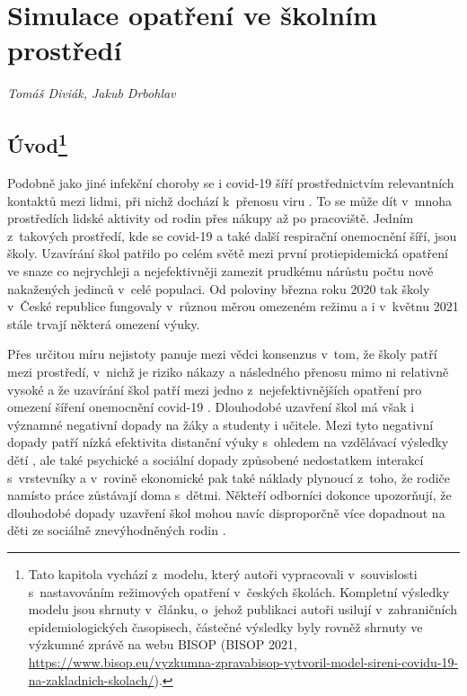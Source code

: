 
\chapter{Simulace opatření ve školním prostředí}\label{Skoly}

\textit{Tomáš Diviák, Jakub Drbohlav}
\vspace{15mm}

\section*{Úvod\footnote{Tato kapitola vychází z~modelu, který autoři vypracovali v~souvislosti s~nastavováním režimových opatření v~českých školách. Kompletní výsledky modelu jsou shrnuty v~článku, o~jehož publikaci autoři usilují v~zahraničních epidemiologických časopisech, částečné výsledky byly rovněž shrnuty ve výzkumné zprávě na webu BISOP (BISOP 2021, \url{https://www.bisop.eu/vyzkumna-zpravabisop-vytvoril-model-sireni-covidu-19-na-zakladnich-skolach/}).}}

Podobně jako jiné infekční choroby se i covid-19 šíří prostřednictvím relevantních kontaktů mezi lidmi, při nichž dochází k~přenosu viru \cite{pg:kucharski2020, vespignani2020modelling}. To se může dít v~mnoha prostředích lidské aktivity od rodin přes nákupy až po pracoviště. Jedním z~takových prostředí, kde se covid-19 a také další respirační onemocnění šíří, jsou školy. Uzavírání škol patřilo po celém světě mezi první protiepidemická opatření ve snaze co nejrychleji a nejefektivněji zamezit prudkému nárůstu počtu nově nakažených jedinců v~celé populaci. Od poloviny března roku 2020 tak školy v~České republice fungovaly v~různou měrou omezeném režimu a i v~květnu 2021 stále trvají některá omezení výuky.

Přes určitou míru nejistoty panuje mezi vědci konsenzus v~tom, že školy patří mezi prostředí, v~nichž je riziko nákazy a následného přenosu mimo ni relativně vysoké a že uzavírání škol patří mezi jedno z~nejefektivnějších opatření pro omezení šíření onemocnění covid-19 \cite{Brauner_etal2020, lessler2021household, Haug_etal2020}. Dlouhodobé uzavření škol má však i významné negativní dopady na žáky a studenty i učitele. Mezi tyto negativní dopady patří nízká efektivita distanční výuky s~ohledem na vzdělávací výsledky dětí \cite{engzell2021learning}, ale také psychické a sociální dopady způsobené nedostatkem interakcí s~vrstevníky \cite{bignardi2020longitudinal, ravens2021impact} a v~rovině ekonomické pak také náklady plynoucí z~toho, že rodiče namísto práce zůstávají doma s~dětmi. Někteří odborníci dokonce upozorňují, že dlouhodobé dopady uzavření škol mohou navíc disproporčně více dopadnout na děti ze sociálně znevýhodněných rodin \cite{di2020likely}.

